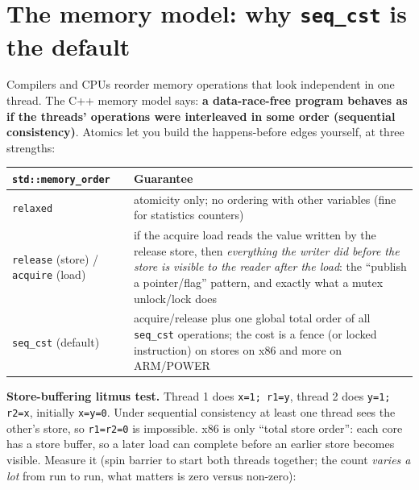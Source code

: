\documentclass[10pt,a4paper,openany,oneside]{report}
\newcommand{\prio}[1]{\texorpdfstring{\ifcase#1\or{\color{gold}\ding{72}}\or{\color{gold}\ding{72}\ding{72}}\or{\color{gold}\ding{72}\ding{72}\ding{72}}\fi}{}}
\begin{document}
\section{The memory model: why \texttt{seq\_cst} is the default \prio{2}}
Compilers and CPUs reorder memory operations that look independent in one thread. The C++ memory model says: \textbf{a data-race-free program behaves as if the threads' operations were interleaved in some order (sequential consistency)}. Atomics let you build the happens-before edges yourself, at three strengths:
\begin{center}\small
\begin{xltabular}{\textwidth}{@{}L{3.4cm}Y@{}}
\toprule
\textbf{\texttt{std::memory\_order}} & \textbf{Guarantee}\\
\midrule\endhead
\texttt{relaxed} & atomicity only; no ordering with other variables (fine for statistics counters)\\
\texttt{release} (store) / \texttt{acquire} (load) & if the acquire load reads the value written by the release store, then \emph{everything the writer did before the store is visible to the reader after the load}: the ``publish a pointer/flag'' pattern, and exactly what a mutex unlock/lock does\\
\texttt{seq\_cst} (default) & acquire/release plus one global total order of all \texttt{seq\_cst} operations; the cost is a fence (or locked instruction) on stores on x86 and more on ARM/POWER\\
\bottomrule
\end{xltabular}
\end{center}
\textbf{Store-buffering litmus test.} Thread 1 does \texttt{x=1; r1=y}, thread 2 does \texttt{y=1; r2=x}, initially \texttt{x=y=0}. Under sequential consistency at least one thread sees the other's store, so \texttt{r1=r2=0} is impossible. x86 is only ``total store order'': each core has a store buffer, so a later load can complete before an earlier store becomes visible. Measure it (spin barrier to start both threads together; the count \emph{varies a lot} from run to run, what matters is zero versus non-zero):
\end{document}
